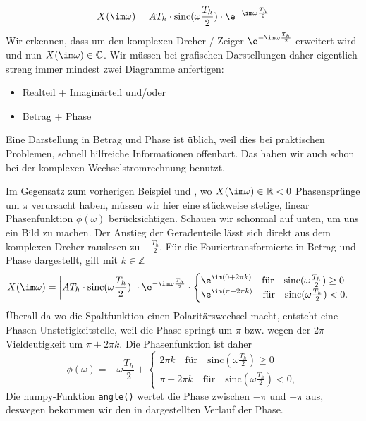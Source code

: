 \begin{Loesung}
\begin{equation}
\label{eq:A8A2DEE53A_Loesung}
X(\im \omega) = A T_h \cdot \mathrm{sinc}(\omega\frac{T_h}{2}) \cdot  \e^{-\im\omega\frac{T_h}{2}}
\end{equation}
%
Wir erkennen, dass  um den komplexen Dreher / Zeiger $\e^{-\im\omega\frac{T_h}{2}}$
erweitert wird und nun $X(\im \omega)\in\mathbb{C}$.
%
Wir müssen bei grafischen Darstellungen daher eigentlich streng immer mindest
zwei Diagramme anfertigen:
\begin{itemize}
  \item Realteil + Imaginärteil und/oder
  \item Betrag + Phase
\end{itemize}
%
Eine Darstellung in Betrag und Phase ist üblich, weil dies bei praktischen
Problemen, schnell hilfreiche Informationen offenbart. Das haben wir auch schon
bei der komplexen Wechselstromrechnung benutzt.


Im Gegensatz zum vorherigen Beispiel und ,
wo $X(\im \omega)\in\mathbb{R}<0$ Phasensprünge um $\pi$ verursacht haben, müssen
wir hier eine stückweise stetige, linear Phasenfunktion $\phi(\omega)$ berücksichtigen.
Schauen wir schonmal auf  unten, um uns ein Bild zu machen.
%
Der Anstieg der Geradenteile lässt sich direkt aus dem komplexen Dreher rauslesen
zu $-\frac{T_h}{2}$.
%
Für die Fouriertransformierte in Betrag und Phase dargestellt, gilt mit $k\in\mathbb{Z}$
\begin{equation}
X(\im \omega) = \bigg|A T_h \cdot \mathrm{sinc}(\omega\frac{T_h}{2})\bigg|
\cdot  \e^{-\im\omega\frac{T_h}{2}}\cdot
\begin{cases}
\e^{\im (0+2\pi k)}\quad \text{für}\quad \mathrm{sinc}(\omega\frac{T_h}{2})\geq0\\
\e^{\im (\pi + 2\pi k)}\quad \text{für}\quad\mathrm{sinc}(\omega\frac{T_h}{2})<0.
\end{cases}
\end{equation}
Überall da wo die Spaltfunktion einen Polaritärswechsel macht, entsteht
eine Phasen-Unstetigkeitstelle, weil die Phase springt um $\pi$ bzw. wegen der
$2\pi$-Vieldeutigkeit um $\pi + 2\pi k$.
%
Die Phasenfunktion ist daher
\begin{equation}
\phi(\omega) = -\omega\frac{T_h}{2} +
\begin{cases}
2\pi k\quad \text{für}\quad \mathrm{sinc}(\omega\frac{T_h}{2})\geq0\\
\pi + 2\pi k\quad \text{für}\quad\mathrm{sinc}(\omega\frac{T_h}{2})<0,
\end{cases}
\end{equation}
Die numpy-Funktion \verb|angle()| wertet die Phase zwischen $-\pi$ und $+\pi$ aus,
deswegen bekommen wir den in  dargestellten Verlauf der Phase.


\end{Loesung}
